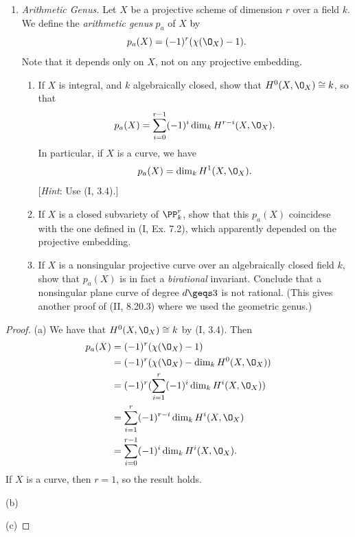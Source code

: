 \documentclass[12pt]{amsart}
\begin{document}
\begin{enumerate}
  \item[5.3.] {
      \emph{Arithmetic Genus.}
      Let $X$ be a projective scheme of dimension $r$ over a field $k$.
      We define the \emph{arithmetic genus} $p_a$ of $X$ by
      \[
        p_a(X)= (-1)^r (\chi(\O_X)-1).
      \] 
      Note that it depends only on $X$, not on any projective embedding.
      \begin{enumerate}
        \item If $X$ is integral, and $k$ algebraically closed, show that $H^0(X,\O_X)\cong k$, so that
          \begin{align*}
            p_a(X)=\sum_{i=0}^{r-1}(-1)^i\dim_k H^{r-i}(X,\O_X).
          \end{align*}
          In particular, if $X$ is a curve, we have
          \[
            p_a(X)=\dim_k H^1(X,\O_X).
          \] 
          [\emph{Hint}: Use (I, 3.4).]
        \item If $X$ is a closed subvariety of $\PP^r_k$, show that this $p_a(X)$ coincidese with the one defined in (I, Ex. 7.2), which apparently depended on the projective embedding.
        \item If $X$ is a nonsingular projective curve over an algebraically closed field $k$, show that $p_a(X)$ is in fact a \emph{birational} invariant.
          Conclude that a nonsingular plane curve of degree $d\geqs 3$ is not rational.
          (This gives another proof of (II, 8.20.3) where we used the geometric genus.)
      \end{enumerate}
    }
\end{enumerate}

\begin{proof}
  (a) We have that $H^0(X,\O_X)\cong k$ by (I, 3.4).
  Then
  \begin{align*}
    p_a(X)
    &= (-1)^r (\chi(\O_X)-1) \\
    &= (-1)^r (\chi(\O_X)- \dim_k H^0(X,\O_X)) \\
    &= (-1)^r (\sum_{i=1}^r (-1)^i\dim_k H^i(X,\O_X)) \\
    &= \sum_{i=1}^r (-1)^{r-i}\dim_kH^i(X,\O_X) \\
    &=\sum_{i=0}^{r-1}(-1)^i \dim_k H^i(X,\O_X).
  \end{align*}
  If $X$ is a curve, then $r=1$, so the result holds.

  (b)

  (c)
\end{proof}
\end{document}
